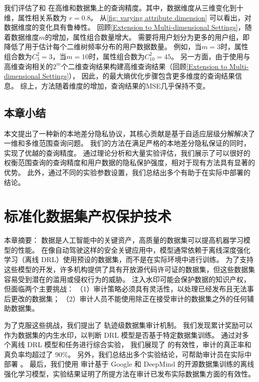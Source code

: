 我们评估了\myahead 和 \myHDG 在高维\Laplacian 和\Gaussian 数据集上的查询精度。其中，数据维度从三维变化到十维，属性相关系数为 $r=0.8$。
从\autoref{fig: varying attribute dimension} 可以看出，\myahead 对数据维度的变化具有鲁棒性。
回顾\autoref{Extension to Multi-dimensional Settings}，随着数据维度$m$的增加，属性组合数量增大。
\lle 需要将用户划分为更多的用户组，即降低了用于估计每个二维\myahead 树频率分布的用户数据数量。
例如，当$m=3$时，属性组合数为$C_3^2=3$，当$m=10$时，属性组合数为$C_{10}^2=45$。
另一方面，由于\lle 使用与高维查询相关的$2^m$个二维查询结果构建高维查询结果（回顾\autoref{Extension to Multi-dimensional Settings}），
因此，\lle 的最大熵优化步骤包含更多维度的查询结果信息。
综上，\lle 方法随着维度的增加，查询结果的MSE几乎保持不变。

\section{本章小结}
本文提出了一种新的本地差分隐私协议，其核心贡献是基于自适应层级分解解决了一维和多维范围查询问题。
我们的方法在满足严格的本地差分隐私保证的同时，实现了优越的查询精度。
通过理论分析和大量实验评估，我们展示了\myahead 可以很好的权衡范围查询的查询精度和用户数据的隐私保护强度，相对于现有方法具有显著的优势。
此外，通过不同的实验参数设置，我们总结出多个有助于在实际中部署\myahead 的结论。






\chapter{标准化数据集产权保护技术}
本章摘要：
数据是人工智能中的关键资产，高质量的数据集可以提高机器学习模型的性能。
在像自动驾驶这样的安全关键应用中，模型通常依赖于离线深度强化学习（离线 DRL）使用预设的数据集，而不是在实际环境中进行训练。
为了支持这些模型的开发，许多机构提供了具有开放源代码许可证的数据集，但这些数据集容易受到潜在的滥用或侵权行为的威胁。
注入水印可能会保护数据的知识产权，但面临两个主要挑战：
（1）审计策略必须具有灵活性，以处理已经发布且无法事后更改的数据集；
（2）审计人员不能使用除正在接受审计的数据集之外的任何辅助数据集。

为了克服这些挑战，我们提出了 \sysnameo 轨迹级数据集审计机制。
我们发现累计奖励可以作为数据集的内生水印，以判断 DRL 模型是否基于特定数据集训练。
通过对多个离线 DRL 模型和任务进行综合实验，
我们展现了 \sysnameo 的有效性，审计的真正率和真负率均超过了 $90\%$。
另外，我们总结出多个实验结论，可帮助审计员在实际中部署 \sysnameo 。
最后，我们使用 \sysnameo 审计基于 Google 和 DeepMind 的开源数据集训练的离线强化学习模型，实验结果证明了所提方法在审计已发布实际数据集方面的有效性。

